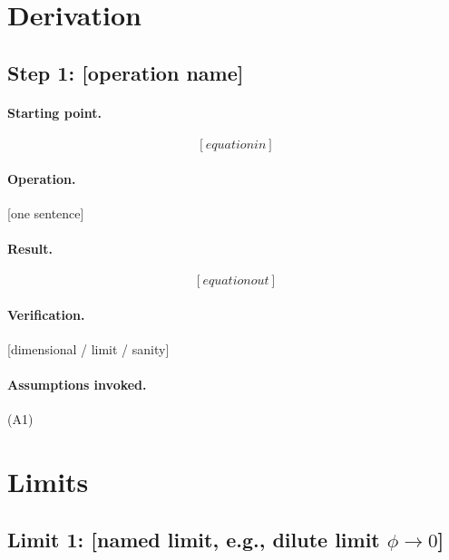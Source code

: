 \documentclass[11pt]{article}
\begin{document}
\section{Derivation}
\label{sec:derivation}


\subsection{Step 1: [operation name]}

\paragraph{Starting point.}
\begin{equation}
    \label{eq:step1-in}
    [equation in]
\end{equation}

\paragraph{Operation.} [one sentence]

\paragraph{Result.}
\begin{equation}
    \label{eq:step1-out}
    [equation out]
\end{equation}

\paragraph{Verification.} [dimensional / limit / sanity]

\paragraph{Assumptions invoked.} (A1)


\section{Limits}
\label{sec:limits}

\subsection{Limit 1: [named limit, e.g., dilute limit $\phi \to 0$]}
\end{document}

